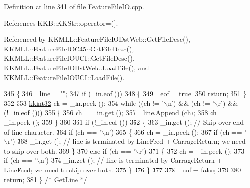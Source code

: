 Definition at line 341 of file Feature\+File\+I\+O.\+cpp.



References K\+K\+B\+::\+K\+K\+Str\+::operator=().



Referenced by K\+K\+M\+L\+L\+::\+Feature\+File\+I\+O\+Dst\+Web\+::\+Get\+File\+Desc(), K\+K\+M\+L\+L\+::\+Feature\+File\+I\+O\+C45\+::\+Get\+File\+Desc(), K\+K\+M\+L\+L\+::\+Feature\+File\+I\+O\+U\+C\+I\+::\+Get\+File\+Desc(), K\+K\+M\+L\+L\+::\+Feature\+File\+I\+O\+Dst\+Web\+::\+Load\+File(), and K\+K\+M\+L\+L\+::\+Feature\+File\+I\+O\+U\+C\+I\+::\+Load\+File().


\begin{DoxyCode}
345 \{
346   \_line = \textcolor{stringliteral}{""};
347   \textcolor{keywordflow}{if}  (\_in.eof ())
348   \{
349     \_eof = \textcolor{keyword}{true};
350     \textcolor{keywordflow}{return};
351   \}
352 
353   \hyperlink{namespace_k_k_b_a8fa4952cc84fda1de4bec1fbdd8d5b1b}{kkint32}  ch = \_in.peek ();
354   \textcolor{keywordflow}{while}  ((ch != \textcolor{charliteral}{'\(\backslash\)n'})  &&  (ch != \textcolor{charliteral}{'\(\backslash\)r'})  &&  (!\_in.eof ()))
355   \{
356     ch = \_in.get ();
357     \_line.\hyperlink{class_k_k_b_1_1_k_k_str_ad23c5c4dccd6122f8629ce95b762f247}{Append} (ch);
358     ch = \_in.peek ();
359   \}
360 
361   \textcolor{keywordflow}{if}  (!\_in.eof ())
362   \{
363     \_in.get ();  \textcolor{comment}{// Skip over end of line character.}
364     \textcolor{keywordflow}{if}  (ch == \textcolor{charliteral}{'\(\backslash\)n'})
365     \{
366       ch = \_in.peek ();
367       \textcolor{keywordflow}{if}  (ch == \textcolor{charliteral}{'\(\backslash\)r'})
368         \_in.get ();  \textcolor{comment}{// line is terminated by LineFeed + CarrageReturn;  we need to skip over both.}
369     \}
370     \textcolor{keywordflow}{else} \textcolor{keywordflow}{if}  (ch  == \textcolor{charliteral}{'\(\backslash\)r'})
371     \{
372       ch = \_in.peek ();
373       \textcolor{keywordflow}{if}  (ch == \textcolor{charliteral}{'\(\backslash\)n'})
374         \_in.get ();  \textcolor{comment}{// line is terminated by CarrageReturn + LineFeed;  we need to skip over both.}
375     \}
376   \}
377 
378   \_eof = \textcolor{keyword}{false};
379 
380   \textcolor{keywordflow}{return};
381 \}  \textcolor{comment}{/* GetLine */}
\end{DoxyCode}
